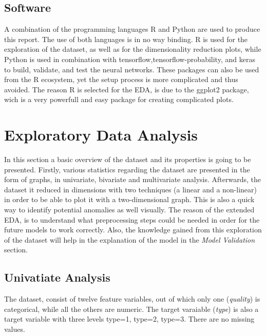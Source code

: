 \documentclass[11pt,twoside]{article}
\numberwithin{Theorem}{section}
\numberwithin{Definition}{section}
\numberwithin{Lemma}{section}
\numberwithin{Algorithm}{section}
\numberwithin{equation}{section}
\begin{document}
\subsection{Software}
\label{sec:software}
A combination of the programming languages \textsf{R} and \textsf{Python} are used to produce this report. The use of both languages is in no way binding. \textsf{R} is used for the exploration of the dataset, as well as for the dimensionality reduction plots, while \textsf{Python} is used in combination with \textsf{tensorflow},\textsf{tensorflow-probability}, and \textsf{keras} to build, validate, and test the neural networks. These packages can also be used from the \textsf{R} ecosystem, yet the setup process is more complicated and thus avoided. The reason \textsf{R} is selected for the EDA, is due to the \textsf{ggplot2} package, wich is a very powerfull and easy package for creating complicated plots.
\clearpage


\section{Exploratory Data Analysis}
In this section a basic overview of the dataset and its properties is going to be presented. Firstly, various statistics regarding the dataset are presented in the form of graphs, in univariate, bivariate and multivariate analysis. Afterwards, the dataset it reduced in dimensions with two techniques (a linear and a non-linear) in order to be able to plot it with a two-dimensional graph. This is also a quick way to identify potential anomalies as well visually. The reason of the extended EDA, is to understand what preprocessing steps could be needed in order for the future models to work correctly. Also, the knowledge gained from this exploration of the dataset will help in the explanation of the model in the \textit{Model Validation} section. 

\subsection{Univatiate Analysis}
\label{sec:univariate}
The dataset, consist of twelve feature variables, out of which only one (\textit{quality}) is categorical, while all the others are numeric. The target varaiable (\textit{type}) is also a target variable with three levels \textsf{type=1, type=2, type=3}. There are no missing values.
\end{document}
